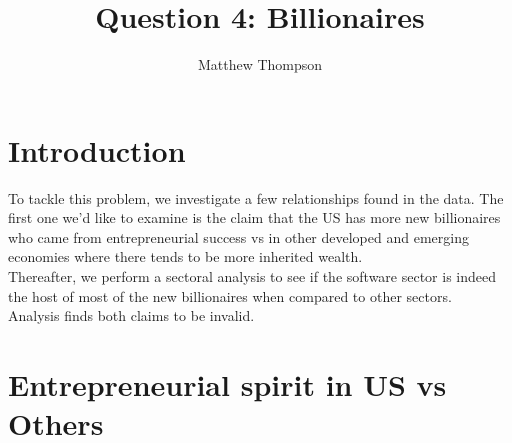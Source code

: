 \documentclass[11pt,preprint]{elsarticle}
\numberwithin{equation}{section}
\numberwithin{figure}{section}
\numberwithin{table}{section}
\begin{document}
\begin{frontmatter}  %

\title{Question 4: Billionaires}





\author[Add1]{Matthew Thompson}





\address[Add1]{Department of Economics, Stellenbosch University}



\vspace{1cm}





\vspace{0.5cm}

\end{frontmatter}

\setcounter{footnote}{0}



\pagestyle{fancy}
\chead{}
\rhead{}
\lfoot{}
\lhead{}
\cfoot{}


\headsep 35pt %




\section{\texorpdfstring{Introduction
\label{Introduction}}{Introduction }}\label{introduction}

To tackle this problem, we investigate a few relationships found in the
data. The first one we'd like to examine is the claim that the US has
more new billionaires who came from entrepreneurial success vs in other
developed and emerging economies where there tends to be more inherited
wealth.\\
Thereafter, we perform a sectoral analysis to see if the software sector
is indeed the host of most of the new billionaires when compared to
other sectors.\\
Analysis finds both claims to be invalid.

\section{Entrepreneurial spirit in US vs
Others}\label{entrepreneurial-spirit-in-us-vs-others}
\end{document}
